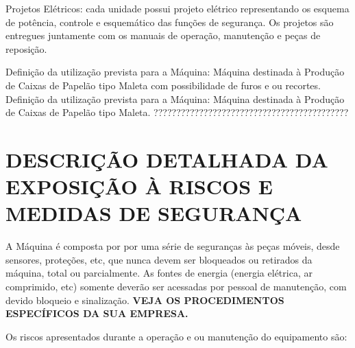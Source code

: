 Projetos Elétricos: cada unidade possui projeto elétrico representando os esquema de potência, controle e esquemático das
 funções de segurança. Os projetos são entregues juntamente com os manuais de operação, manutenção e
 peças de reposição.

 \ifmachineType

  \ifunidadePerfuradora
       Definição da utilização prevista para a Máquina:
 Máquina destinada à Produção de Caixas de Papelão tipo Maleta com possibilidade de furos e ou recortes.
 \else
 Definição da utilização prevista para a Máquina:
 Máquina destinada à Produção de Caixas de Papelão tipo Maleta.
    \fi
\else
???????????????????????????????????????????
\fi
\vspace*{\fill}
\vspace*{\fill}
\newpage
\thispagestyle{fancy}
\vspace*{\fill}

\section{\large{\MakeUppercase{Descrição detalhada da Exposição à Riscos e Medidas de Segurança}}}

A Máquina é composta por por uma série de seguranças às peças móveis, desde sensores, proteções, etc, que nunca devem
ser bloqueados ou retirados da máquina, total ou parcialmente. As fontes de energia (energia elétrica, ar comprimido, etc)
somente deverão ser acessadas por pessoal de manutenção, com devido bloqueio e sinalização.
\textbf{VEJA OS PROCEDIMENTOS ESPECÍFICOS DA SUA EMPRESA.}

Os riscos apresentados durante a operação e ou manutenção do equipamento são:




